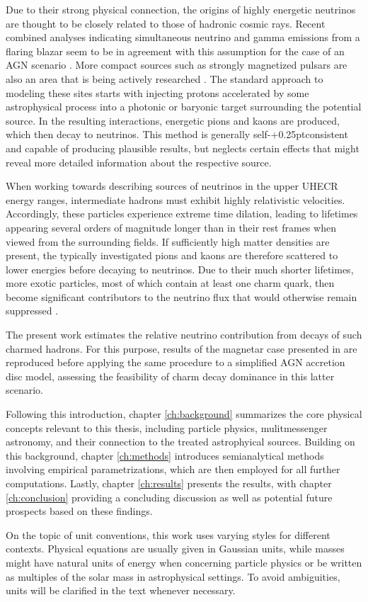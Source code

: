 Due to their strong physical connection, the origins of highly energetic neutrinos are thought to be closely related
to those of hadronic cosmic rays. Recent combined analyses indicating simultaneous neutrino and gamma emissions from a
flaring blazar seem to be in agreement with this assumption for the case of an AGN scenario \cite{ic_blazar_flare, ic_blazar_signal}.
More compact sources such as strongly magnetized pulsars are also an area that is being actively researched \cite{Murase_2009}.
The standard approach to modeling these sites starts with injecting protons accelerated by some astrophysical process into
a photonic or baryonic target surrounding the potential source. In the resulting interactions, energetic pions and kaons are
produced, which then decay to neutrinos. This method is generally self-{\kern+0.25pt}consistent and capable of producing
plausible results, but neglects certain effects that might reveal more detailed information about the respective source.

When working towards describing sources of neutrinos in the upper UHECR energy ranges, intermediate hadrons must exhibit
highly relativistic velocities. Accordingly, these particles experience extreme time dilation, leading to lifetimes
appearing several orders of magnitude longer than in their rest frames when viewed from the surrounding fields.
If sufficiently high matter densities are present, the typically investigated pions and kaons are therefore scattered
to lower energies before decaying to neutrinos. Due to their much shorter lifetimes, more exotic particles, most of which
contain at least one charm quark, then become significant contributors to the neutrino flux that would otherwise remain
suppressed \cite{Tjus_2023}.

The present work estimates the relative neutrino contribution from decays of such charmed hadrons. For this purpose, results
of the magnetar case presented in \cite{Carpio_2020} are reproduced before applying the same procedure to a simplified AGN
accretion disc model, assessing the feasibility of charm decay dominance in this latter scenario.

Following this introduction, chapter \ref{ch:background} summarizes the core physical concepts relevant to this thesis,
including particle physics, mulitmessenger astronomy, and their connection to the treated astrophyical sources. Building
on this background, chapter \ref{ch:methods} introduces semianalytical methods involving empirical parametrizations,
which are then employed for all further computations. Lastly, chapter \ref{ch:results} presents the results, with chapter
\ref{ch:conclusion} providing a concluding discussion as well as potential future prospects based on these findings.

On the topic of unit conventions, this work uses varying styles for different contexts. Physical equations are usually given
in Gaussian units, while masses might have natural units of energy when concerning particle physics or be written as multiples
of the solar mass in astrophysical settings. To avoid ambiguities, units will be clarified in the text whenever necessary.
